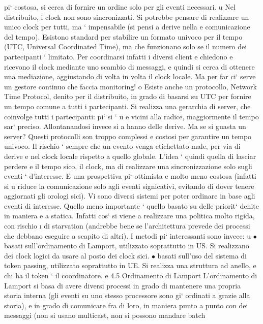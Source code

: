 \documentclass[a4paper,12pt]{article}
\begin{document}
pi` costosa, si cerca di fornire un ordine solo per gli eventi necessari.
u
Nel distribuito, i clock non sono sincronizzati. Si potrebbe pensare di realizzare un unico clock per tutti, ma `
impensabile (si pensi a derive nella
e
comunicazione del tempo). Esistono standard per stabilire un formato univoco per il tempo (UTC, Universal Coordinated
Time), ma che funzionano solo
se il numero dei partecipanti ` limitato. Per coordinarsi infatti i diversi client
e
chiedono e ricevono il clock mediante uno scambio di messaggi, e quindi si cerca
di ottenere una mediazione, aggiustando di volta in volta il clock locale. Ma per
far ci` serve un gestore continuo che faccia monitoring!
o
Esiste anche un protocollo, Network Time Protocol, denito per il distribuito,
in grado di basarsi su UTC per fornire un tempo comune a tutti i partecipanti.
Si realizza una gerarchia di server, che coinvolge tutti i partecipanti: pi` si `
u e
vicini alla radice, maggiormente il tempo sar` preciso. Allontanandosi invece si
a
hanno delle derive. Ma se si guasta un server?
Questi protocolli son troppo complessi e costosi per garantire un tempo univoco. Il rischio ` sempre che un evento venga
etichettato male, per via di derive
e
nel clock locale rispetto a quello globale. L'idea ` quindi quella di lasciar perdere
e
il tempo sico, il clock, ma di realizzare una sincronizzazione solo sugli eventi
`
d'interesse. E una prospettiva pi` ottimista e molto meno costosa (infatti si
u
riduce la comunicazione solo agli eventi signicativi, evitando di dover tenere
aggiornati gli orologi sici).
Vi sono diversi sistemi per poter ordinare in base agli eventi di interesse.
Quello meno importante ` quello basato su delle priorit` denite in maniera
e
a
statica. Infatti cos` si viene a realizzare una politica molto rigida, con rischio
\i{}
di starvation (andrebbe bene se l'architettura prevede dei processi che debbano
eseguire a scapito di altri).
I metodi pi` interessanti sono invece:
u
$\bullet$ basati sull'ordinamento di Lamport, utilizzato soprattutto in US. Si realizzano dei clock logici da usare al
posto dei clock sici.
$\bullet$ basati sull'uso del sistema di token passing, utilizzato soprattutto in UE.
Si realizza una struttura ad anello, e chi ha il token ` il coordinatore.
e
4.5
Ordinamento di Lamport
L'ordinamento di Lamport si basa di avere diversi processi in grado di mantenere
una propria storia interna (gli eventi su uno stesso processore sono gi` ordinati
a
grazie alla storia), e in grado di comunicare fra di loro, in maniera punto a
punto con dei messaggi (non si usano multicast, non si possono mandare batch
\end{document}
